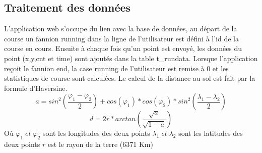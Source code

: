 \documentclass[a4paper,11pt]{article}
\begin{document}
\subsection{Traitement des données}
L'application web s'occupe du lien avec la base de données, au départ de la course un fannion running dans la ligne de l'utilisateur est défini à l'id de la course en cours.\newline
Ensuite à chaque fois qu'un point est envoyé, les données du point (x,y,cnt et time) sont ajoutés dans la table t\_rundata.\newline
Lorsque l'application reçoit le fannion end, la case running de l'utilisateur est remise à 0 et les statistiques de course sont calculées.
Le calcul de la distance au sol est fait par la formule d'Haversine.
\begin{equation*}
a = sin^2(\frac{\varphi_1 - \varphi_2}{2}) + cos(\varphi_1) * cos(\varphi_2) * sin^2(\frac{\lambda_1 - \lambda_2}{2})
\end{equation*}
\begin{equation*}
d = 2r *arctan\left(\frac{\sqrt{a}}{\sqrt{1-a}}\right)
\end{equation*}
Où \newline
$\varphi_1 \; et \; \varphi_2$ sont les longitudes des deux points\newline
$\lambda_1 \; et \; \lambda_2$ sont les latitudes des deux points\newline
$r$ est le rayon de la terre (6371 Km)\newline
\end{document}
